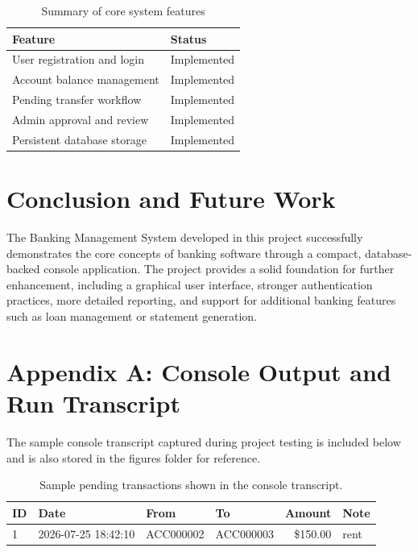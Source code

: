 \documentclass[12pt,a4paper]{report}
\begin{document}
\begin{table}[H]
  \centering
  \caption{Summary of core system features}
  \begin{tabular}{|p{}|p{}|}
    \hline
    \textbf{Feature} & \textbf{Status} \\
    \hline
    User registration and login & Implemented \\
    \hline
    Account balance management & Implemented \\
    \hline
    Pending transfer workflow & Implemented \\
    \hline
    Admin approval and review & Implemented \\
    \hline
    Persistent database storage & Implemented \\
    \hline
  \end{tabular}
\end{table}

\chapter{Conclusion and Future Work}
The Banking Management System developed in this project successfully demonstrates the core concepts of banking software through a compact, database-backed console application. The project provides a solid foundation for further enhancement, including a graphical user interface, stronger authentication practices, more detailed reporting, and support for additional banking features such as loan management or statement generation.


\cleardoublepage
\chapter*{Appendix A: Console Output and Run Transcript}
The sample console transcript captured during project testing is included below and is also stored in the figures folder for reference.
\begingroup
\small
\ttfamily
\sloppy

\endgroup

\begin{table}[H]
  \centering
  \small
  \begin{tabularx}{\textwidth}{l l l l r X}
    \hline
    ID & Date & From & To & Amount & Note \\
    \hline
    1 & 2026-07-25 18:42:10 & ACC000002 & ACC000003 & \$150.00 & rent \\
    \hline
  \end{tabularx}
  \caption{Sample pending transactions shown in the console transcript.}
\end{table}
\end{document}
